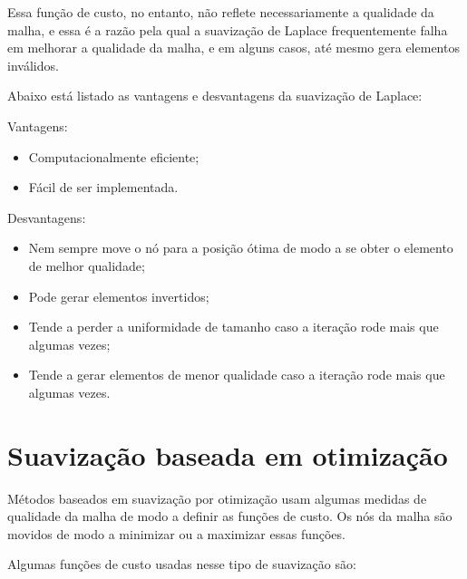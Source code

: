 Essa função de custo, no entanto, não reflete necessariamente a qualidade da malha, e essa é a razão pela qual a suavização de Laplace frequentemente falha em melhorar a qualidade da malha, e em alguns casos, até mesmo gera elementos inválidos.

Abaixo está listado as vantagens e desvantagens da suavização de Laplace:

Vantagens:
\begin{itemize}
    \item Computacionalmente eficiente;
    \item Fácil de ser implementada.
\end{itemize}

Desvantagens:
\begin{itemize}
    \item Nem sempre move o nó para a posição ótima de modo a se obter o elemento de melhor qualidade;
    \item Pode gerar elementos invertidos;
    \item Tende a perder a uniformidade de tamanho caso a iteração rode mais que algumas vezes;
    \item Tende a gerar elementos de menor qualidade caso a iteração rode mais que algumas vezes.
\end{itemize}

\section{Suavização baseada em otimização}

Métodos baseados em suavização por otimização usam algumas medidas de qualidade da malha de modo a definir as funções de custo. Os nós da malha são movidos de modo a minimizar ou a maximizar essas funções.

Algumas funções de custo usadas nesse tipo de suavização são:

